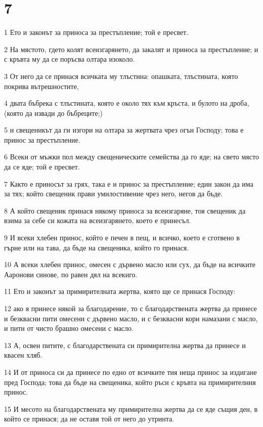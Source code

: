 \chapter{7}

\par 1 Ето и законът за приноса за престъпление; той е пресвет.
\par 2 На мястото, гдето колят всеизгарянето, да закалят и приноса за престъпление; и с кръвта му да се поръсва олтара изоколо.
\par 3 От него да се принася всичката му тлъстина: опашката, тлъстината, която покрива вътрешностите,
\par 4 двата бъбрека с тлъстината, която е около тях към кръста, и булото на дроба, (която да извади до бъбреците;)
\par 5 и свещеникът да ги изгори на олтара за жертвата чрез огън Господу; това е принос за престъпление.
\par 6 Всеки от мъжки пол между свещеническите семейства да го яде; на свето място да се яде; той е пресвет.
\par 7 Както е приносът за грях, така е и принос за престъпление; един закон да има за тях; който свещеник прави умилостивение чрез него, негов да бъде.
\par 8 А който свещеник принася някому приноса за всеизгаряне, тоя свещеник да взима за себе си кожата на всеизгарянето, което е принесъл.
\par 9 И всеки хлебен принос, който е печен в пещ, и всичко, което е сготвено в гърне или на тава, да бъде на свещеника, който го принася.
\par 10 А всеки хлебен принос, омесен с дървено масло или сух, да бъде на всичките Ааронови синове, по равен дял на всекиго.
\par 11 Ето и законът за примирителната жертва, която ще се принася Господу:
\par 12 ако я принесе някой за благодарение, то с благодарствената жертва да принесе и безквасни пити омесени с дървено масло, и с безквасни кори намазани с масло, и пити от чисто брашно омесени с масло.
\par 13 А, освен питите, с благодарствената си примирителна жертва да принесе и квасен хляб.
\par 14 И от приноса си да принесе по едно от всичките тия неща принос за издигане пред Господа; това да бъде на свещеника, който ръси с кръвта на примирителния принос.
\par 15 И месото на благодарствената му примирителна жертва да се яде същия ден, в който се принася; да не оставя той от него до утринта.
